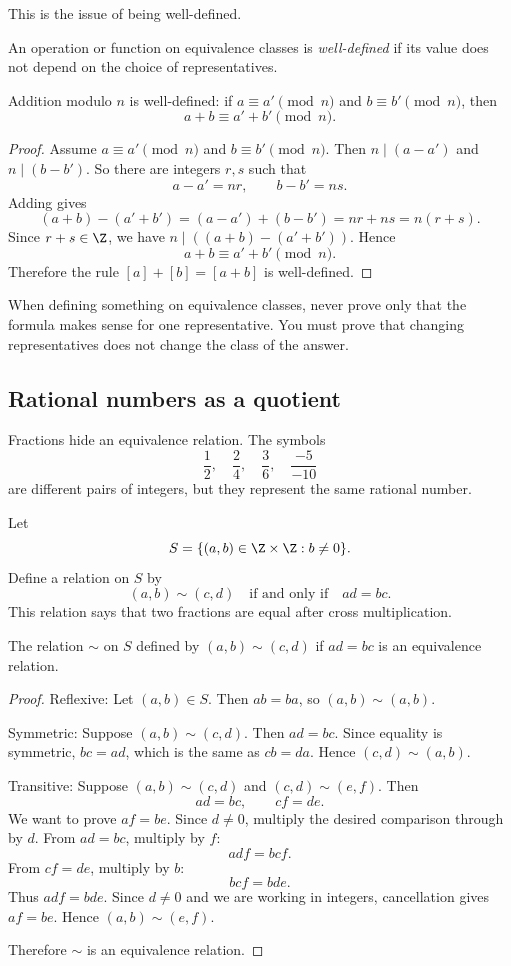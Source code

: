 This is the issue of being well-defined.

\begin{definition}
An operation or function on equivalence classes is \emph{well-defined} if its value does not depend on the choice of representatives.
\end{definition}

\begin{theorem}
Addition modulo $n$ is well-defined: if $a\equiv a'\pmod n$ and $b\equiv b'\pmod n$, then
\[
a+b\equiv a'+b'\pmod n.
\]
\end{theorem}

\begin{proof}
Assume $a\equiv a'\pmod n$ and $b\equiv b'\pmod n$. Then $n\mid(a-a')$ and $n\mid(b-b')$. So there are integers $r,s$ such that
\[
a-a'=nr,\qquad b-b'=ns.
\]
Adding gives
\[
(a+b)-(a'+b')=(a-a')+(b-b')=nr+ns=n(r+s).
\]
Since $r+s\in\Z$, we have $n\mid((a+b)-(a'+b'))$. Hence
\[
a+b\equiv a'+b'\pmod n.
\]
Therefore the rule $[a]+[b]=[a+b]$ is well-defined.
\end{proof}

\begin{trapbox}
When defining something on equivalence classes, never prove only that the formula makes sense for one representative. You must prove that changing representatives does not change the class of the answer.
\end{trapbox}

\subsection{Rational numbers as a quotient}

Fractions hide an equivalence relation. The symbols
\[
\frac12,\quad \frac24,\quad \frac36,\quad \frac{-5}{-10}
\]
are different pairs of integers, but they represent the same rational number.

Let
\[
S=\{(a,b)\in\Z\times\Z:b\neq0\}.
\]
Define a relation on $S$ by
\[
(a,b)\sim(c,d)\quad\text{if and only if}\quad ad=bc.
\]
This relation says that two fractions are equal after cross multiplication.

\begin{theorem}
The relation $\sim$ on $S$ defined by $(a,b)\sim(c,d)$ if $ad=bc$ is an equivalence relation.
\end{theorem}

\begin{proof}
Reflexive: Let $(a,b)\in S$. Then $ab=ba$, so $(a,b)\sim(a,b)$.

Symmetric: Suppose $(a,b)\sim(c,d)$. Then $ad=bc$. Since equality is symmetric, $bc=ad$, which is the same as $cb=da$. Hence $(c,d)\sim(a,b)$.

Transitive: Suppose $(a,b)\sim(c,d)$ and $(c,d)\sim(e,f)$. Then
\[
ad=bc,\qquad cf=de.
\]
We want to prove $af=be$. Since $d\neq0$, multiply the desired comparison through by $d$. From $ad=bc$, multiply by $f$:
\[
adf=bcf.
\]
From $cf=de$, multiply by $b$:
\[
bcf=bde.
\]
Thus $adf=bde$. Since $d\neq0$ and we are working in integers, cancellation gives $af=be$. Hence $(a,b)\sim(e,f)$.

Therefore $\sim$ is an equivalence relation.
\end{proof}

